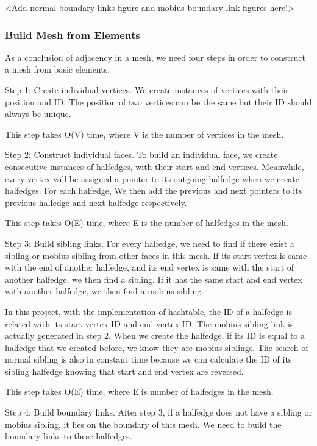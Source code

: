 \documentclass[12pt]{article}
\begin{document}
<Add normal boundary links figure and mobius boundary link figures here!>

\subsubsection{Build Mesh from Elements}

As a conclusion of adjacency in a mesh, we need four steps in order to construct a mesh from basic elements.

Step 1: Create individual vertices. We create instances of vertices with their position and ID. The position of two vertices can be the same but their ID should always be unique. 

This step takes O(V) time, where V is the number of vertices in the mesh.

Step 2: Construct individual faces. To build an individual face, we create consecutive instances of halfedges, with their start and end vertices. Meanwhile, every vertex will be assigned a pointer to its outgoing halfedge when we create halfedges. For each halfedge, We then add the previous and next pointers to its previous halfedge and next halfedge respectively. 

This step takes O(E) time, where E is the number of halfedges in the mesh.

Step 3: Build sibling links. For every halfedge, we need to find if there exist a sibling or mobius sibling from other faces in this mesh. If its start vertex is same with the end of another halfedge, and its end vertex is same with the start of another halfedge, we then find a sibling. If it has the same start and end vertex with another halfedge, we then find a mobius sibling. 

In this project, with the implementation of hashtable, the ID of a halfedge is related with its start vertex ID and end vertex ID. The mobius sibling link is actually generated in step 2. When we create the halfedge, if its ID is equal to a halfedge that we created before, we know they are mobius siblings. The search of normal sibling is also in constant time because we can calculate the ID of its sibling halfedge knowing that start and end vertex are reversed. 

This step takes O(E) time, where E is number of halfedges in the mesh.

Step 4: Build boundary links. After step 3, if a halfedge does not have a sibling or mobius sibling, it lies on the boundary of this mesh. We need to build the boundary links to these halfedges.
\end{document}
